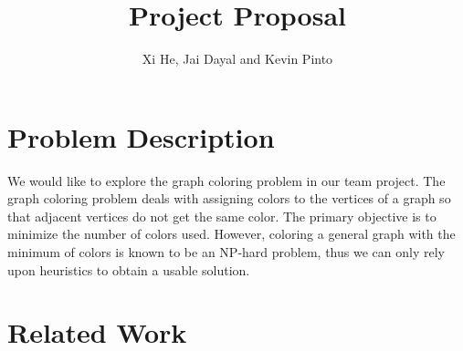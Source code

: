\documentclass[10pt]{article}
\begin{document}
\title{Project Proposal}
\author{Xi He, Jai Dayal and Kevin Pinto}

\maketitle
\section{Problem Description}
We would like to explore the graph coloring problem in our team project. The graph coloring problem deals with assigning colors to the vertices of a graph so that adjacent vertices do not get the same color. The primary objective is to minimize the number of colors used. However, coloring a general graph with the minimum of colors is known to be an NP-hard problem\cite{garey1979computers}, thus we can only rely upon heuristics to obtain a usable solution.
\section{Related Work}

\end{document}
